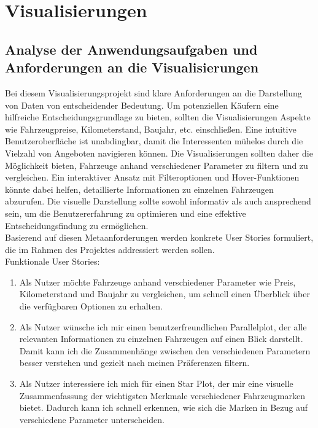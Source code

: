 \section{Visualisierungen}

\subsection{Analyse der Anwendungsaufgaben und Anforderungen an die Visualisierungen}

Bei diesem Visualisierungsprojekt sind klare Anforderungen an die Darstellung von Daten von entscheidender Bedeutung. Um potenziellen Käufern eine hilfreiche Entscheidungsgrundlage zu bieten, sollten die Visualisierungen Aspekte wie Fahrzeugpreise, Kilometerstand, Baujahr, etc. einschließen. Eine intuitive Benutzeroberfläche ist unabdingbar, damit die Interessenten mühelos durch die Vielzahl von Angeboten navigieren können. Die Visualisierungen sollten daher die Möglichkeit bieten, Fahrzeuge anhand verschiedener Parameter zu filtern und zu vergleichen. Ein interaktiver Ansatz mit Filteroptionen und Hover-Funktionen könnte dabei helfen, detaillierte Informationen zu einzelnen Fahrzeugen abzurufen. Die visuelle Darstellung sollte sowohl informativ als auch ansprechend sein, um die Benutzererfahrung zu optimieren und eine effektive Entscheidungsfindung zu ermöglichen.  \\
Basierend auf diesen Metaanforderungen werden konkrete User Stories formuliert, die im Rahmen des Projektes addressiert werden sollen. \\
Funktionale User Stories: \\
\begin{enumerate}

    \item Als Nutzer möchte  Fahrzeuge anhand verschiedener Parameter wie Preis, Kilometerstand und Baujahr zu vergleichen, um schnell einen Überblick über die verfügbaren Optionen zu erhalten.
    
    \item Als Nutzer wünsche ich mir einen benutzerfreundlichen Parallelplot, der alle relevanten Informationen zu einzelnen Fahrzeugen auf einen Blick darstellt. Damit kann ich die Zusammenhänge zwischen den verschiedenen Parametern besser verstehen und gezielt nach meinen Präferenzen filtern.
    
    \item Als Nutzer interessiere ich mich für einen Star Plot, der mir eine visuelle Zusammenfassung der wichtigsten Merkmale verschiedener Fahrzeugmarken bietet. Dadurch kann ich schnell erkennen, wie sich die Marken in Bezug auf verschiedene Parameter unterscheiden.
\end{enumerate}

